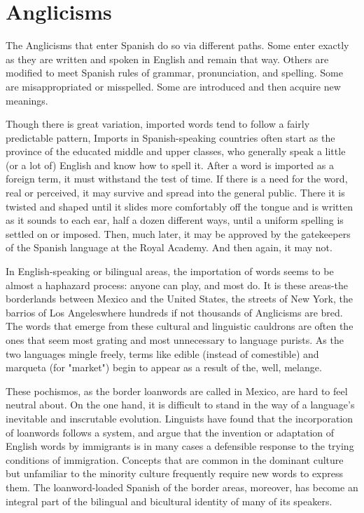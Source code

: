 \section{Anglicisms}

The Anglicisms that enter Spanish do so via different paths.
Some enter exactly as they are written and spoken in English and remain that way. Others are modified to meet Spanish rules of grammar,
pronunciation, and spelling. Some are misappropriated or misspelled.
Some are introduced and then acquire new meanings.

Though there is great variation, imported words tend to follow
a fairly predictable pattern, Imports in Spanish-speaking countries often start as the province of the educated middle and upper classes, who
generally speak a little (or a lot of) English and know how to spell it.
After a word is imported as a foreign term, it must withstand the test
of time. If there is a need for the word, real or perceived, it may survive
and spread into the general public. There it is twisted and shaped until
it slides more comfortably off the tongue and is written as it sounds to
each ear, half a dozen different ways, until a uniform spelling is settled
on or imposed. Then, much later, it may be approved by the gatekeepers of the Spanish language at the Royal Academy. And then again, it
may not.

In English-speaking or bilingual areas, the importation of
words seems to be almost a haphazard process: anyone can play, and
most do. It is these areas-the borderlands between Mexico and the
United States, the streets of New York, the barrios of Los Angeleswhere hundreds if not thousands of Anglicisms are bred. The words
that emerge from these cultural and linguistic cauldrons are often the
ones that seem most grating and most unnecessary to language purists.
As the two languages mingle freely, terms like edible (instead of comestible) and marqueta (for "market") begin to appear as a result of
the, well, melange.

These pochismos, as the border loanwords are called in
Mexico, are hard to feel neutral about. On the one hand, it is difficult to
stand in the way of a language's inevitable and inscrutable evolution.
Linguists have found that the incorporation of loanwords follows a system, and argue that the invention or adaptation of English words by
immigrants is in many cases a defensible response to the trying conditions of immigration. Concepts that are common in the dominant culture but unfamiliar to the minority culture frequently require new
words to express them. The loanword-loaded Spanish of the border
areas, moreover, has become an integral part of the bilingual and bicultural identity of many of its speakers.

